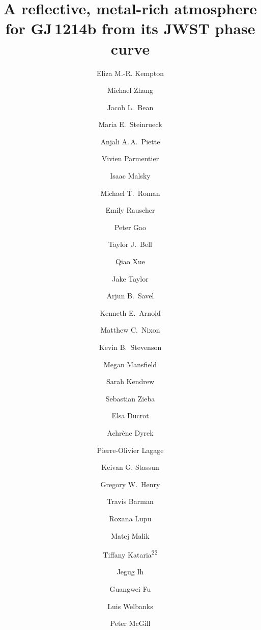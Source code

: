 \documentclass[pdflatex,sn-standardnature]{sn-jnl}%
\begin{document}



\title[GJ\,1214b Phase Curve]{A reflective, metal-rich atmosphere for GJ\,1214b from its JWST phase curve}


\author[1]{Eliza M.-R. Kempton} %

\author[2]{Michael Zhang}
\author[2]{Jacob L.\ Bean}
\author[3]{Maria E.\ Steinrueck}
\author[4]{Anjali A.\,A.\ Piette}
\author[5,6]{Vivien Parmentier}
\author[7]{Isaac Malsky}
\author[8]{Michael T.\ Roman}
\author[7]{Emily Rauscher}
\author[4]{Peter Gao}
\author[9]{Taylor J.\ Bell}
\author[2]{Qiao Xue}
\author[5,10]{Jake Taylor}
\author[1,11]{Arjun B.\ Savel}
\author[1]{Kenneth E.\ Arnold}
\author[1]{Matthew C.\ Nixon}
\author[12]{Kevin B.\ Stevenson}
\author[13]{Megan Mansfield}
\author[14]{Sarah Kendrew}
\author[3,15]{Sebastian Zieba}
\author[16,17]{Elsa Ducrot}
\author[17]{Achr\`{e}ne Dyrek}
\author[17]{Pierre-Olivier Lagage}
\author[18]{Keivan G. Stassun}
\author[19]{Gregory W.\ Henry}
\author[20]{Travis Barman}
\author[21]{Roxana Lupu}
\author[1]{Matej Malik}
\author[22]{Tiffany Kataria\textsuperscript{22}}
\author[1]{Jegug Ih}
\author[23]{Guangwei Fu}
\author[24]{Luis Welbanks}
\author[25]{Peter McGill}
\end{document}

